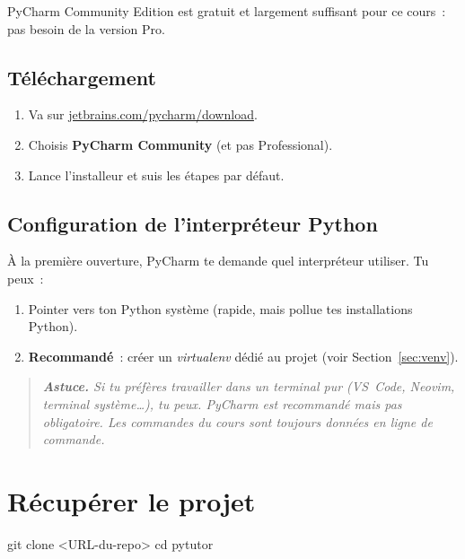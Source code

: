 \documentclass[11pt,a4paper]{article}
\begin{document}
PyCharm Community Edition est gratuit et largement suffisant pour ce
cours~: pas besoin de la version Pro.

\subsection{Téléchargement}

\begin{enumerate}[leftmargin=*]
  \item Va sur
        \href{https://www.jetbrains.com/pycharm/download/}{jetbrains.com/pycharm/download}.
  \item Choisis \textbf{PyCharm Community} (et pas Professional).
  \item Lance l'installeur et suis les étapes par défaut.
\end{enumerate}

\subsection{Configuration de l'interpréteur Python}

À la première ouverture, PyCharm te demande quel interpréteur
utiliser. Tu peux~:

\begin{enumerate}[leftmargin=*]
  \item Pointer vers ton Python système (rapide, mais pollue tes
        installations Python).
  \item \textbf{Recommandé}~: créer un \emph{virtualenv} dédié au
        projet (voir Section~\ref{sec:venv}).
\end{enumerate}

\begin{quote}\itshape
\textbf{Astuce.} Si tu préfères travailler dans un terminal pur
(VS~Code, Neovim, terminal système\dots), tu peux. PyCharm est
recommandé mais pas obligatoire. Les commandes du cours sont
toujours données en ligne de commande.
\end{quote}

\section{Récupérer le projet}

\begin{bashcode}
git clone <URL-du-repo>
cd pytutor
\end{bashcode}
\end{document}
